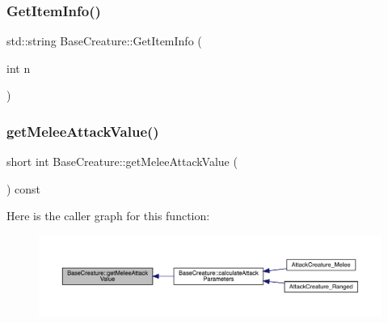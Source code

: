\mbox{\label{class_base_creature_a19f380cccb11f31d10d00de934da1b7f}} 
\subsubsection{\texorpdfstring{Get\+Item\+Info()}{GetItemInfo()}}
{\footnotesize\ttfamily std\+::string Base\+Creature\+::\+Get\+Item\+Info (\begin{DoxyParamCaption}\item[{int}]{n }\end{DoxyParamCaption})}

\mbox{\label{class_base_creature_a7b4f974b77953aea8f4c698e6e21c500}} 
\subsubsection{\texorpdfstring{get\+Melee\+Attack\+Value()}{getMeleeAttackValue()}}
{\footnotesize\ttfamily short int Base\+Creature\+::get\+Melee\+Attack\+Value (\begin{DoxyParamCaption}{ }\end{DoxyParamCaption}) const}

Here is the caller graph for this function\+:
\nopagebreak
\begin{figure}[H]
\begin{center}
\leavevmode
\includegraphics[width=350pt]{d2/d3b/class_base_creature_a7b4f974b77953aea8f4c698e6e21c500_icgraph}
\end{center}
\end{figure}
\mbox{\label{class_base_creature_a00ebdc186dd6d3c0ef3c3d1262d4363f}} 
